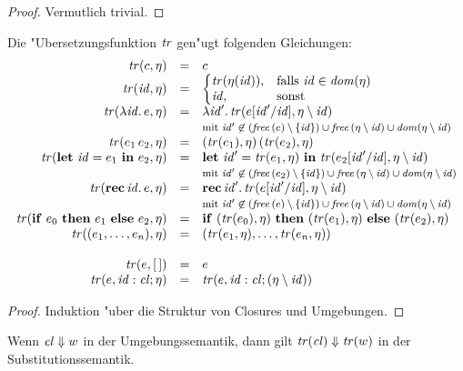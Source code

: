 \documentclass[12pt,fleqn,a4paper]{article}
\newcommand{\cl}{\name{cl}}
\begin{document}
\begin{proof}
  Vermutlich trivial.
\end{proof}

\begin{lemma}
  Die "Ubersetzungsfunktion ${\text{\it tr\/}}$ gen"ugt folgenden Gleichungen:
  \[\begin{array}{rcl}
    \tr{c,\eta} &=& c \\
    \tr{\id,\eta} &=& \bcase \tr{\eta(\id)}, & \text{falls } \id\in\dom{\eta} \\ \id, & \text{sonst} \ecase \\
    \tr{\abstr{\id}{e},\eta} &=& \abstr{\id'}{\tr{e[\id'/\id],\eta \setminus \id}} \\
      && \text{\footnotesize{mit
          $\id'\not\in(\free{e}\setminus\{\id\}) \cup \free{\eta\setminus\id} \cup \dom{\eta\setminus\id}$}} \\
    \tr{\app{e_1}{e_2},\eta} &=& \app{(\tr{e_1},\eta)}{(\tr{e_2},\eta)} \\
    \tr{\bli{\id}{e_1}{e_2},\eta} &=& \bli{\id'}{\tr{e_1,\eta}}{\tr{e_2[\id'/\id],\eta \setminus \id}} \\
      && \text{\footnotesize{mit
          $\id'\not\in(\free{e_2}\setminus\{\id\}) \cup \free{\eta\setminus\id} \cup \dom{\eta\setminus\id}$}} \\
    \tr{\rec{\id}{e},\eta} &=& \rec{\id'}{\tr{e[\id'/\id],\eta \setminus \id}} \\
      && \text{\footnotesize{mit
          $\id'\not\in(\free{e}\setminus\{\id\}) \cup \free{\eta\setminus\id} \cup \dom{\eta\setminus\id}$}} \\
    \tr{\bifte{e_0}{e_1}{e_2},\eta} &=& \bifte{(\tr{e_0},\eta)}{(\tr{e_1},\eta)}{(\tr{e_2},\eta)} \\
    \tr{(e_1,\ldots,e_n),\eta} &=& (\tr{e_1,\eta},\ldots,\tr{e_n,\eta}) \\
    \\
    \tr{e,[\,]} &=& e \\
    \tr{e,\id:\cl;\eta} &=& \tr{e,\id:\cl;(\eta \setminus \id)} \\
  \end{array}\]
\end{lemma}

\begin{proof}
  Induktion "uber die Struktur von Closures und Umgebungen.
\end{proof}

\begin{theorem} \label{theorem:Korr}
  Wenn $\cl \Downarrow w$ in der Umgebungssemantik, dann gilt $\tr{\cl} \Downarrow \tr{w}$ in der
  Substitutionssemantik.
\end{theorem}
\end{document}
